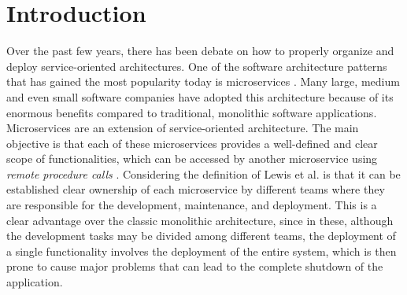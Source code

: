 \documentclass[english, 12pt, a4paper, sci, utf8, a-1b, online]{aaltothesis}
\begin{document}
\cleardoublepage


\section{Introduction}


Over the past few years, there has been debate on how to properly organize and deploy service-oriented architectures. One of the software architecture patterns that has gained the most popularity today is microservices \cite{MicroservicesAdoption}. Many large, medium and even small software companies have adopted this architecture because of its enormous benefits compared to traditional, monolithic software applications.\\

Microservices are an extension of service-oriented architecture. The main objective is that each of these microservices provides a well-defined and clear scope of functionalities, which can be accessed by another microservice using \textit{remote procedure calls} \cite{nelson1981remote}. Considering the definition of Lewis et al. \cite{MicroservicesCharacteristics} is that it can be established clear ownership of each microservice by different teams where they are responsible for the development, maintenance, and deployment. This is a clear advantage over the classic monolithic architecture, since in these, although the development tasks may be divided among different teams, the deployment of a single functionality involves the deployment of the entire system, which is then prone to cause major problems that can lead to the complete shutdown of the application.\\
\end{document}
